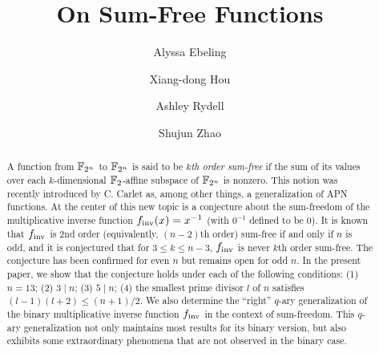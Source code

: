 \documentclass{amsart}
\numberwithin{equation}{section}
\theoremstyle{definition}
\begin{document}
\title[On Sum-Free Functions]{On Sum-Free Functions}

\author[A. Ebeling]{Alyssa Ebeling}
\address{School of Mathematical and Physical Sciences, Wisconsin Lutheran College, Milwaukee, WI 53226}

\author[X. Hou]{Xiang-dong Hou}
\address{Department of Mathematics and Statistics,
University of South Florida, Tampa, FL 33620}

\author[A. Rydell]{Ashley Rydell}
\address{Mathematics and Statistics Department,
Sonoma State University,
Rohnert Park, CA 94928}

\author[S. Zhao]{Shujun Zhao}
\address{Department of Mathematics and Statistics,
University of South Florida, Tampa, FL 33620}



\begin{abstract}
A function from $\Bbb F_{2^n}$ to $\Bbb F_{2^n}$ is said to be {\em $k$th order sum-free} if the sum of its values over each $k$-dimensional $\Bbb F_2$-affine subspace of $\Bbb F_{2^n}$ is nonzero. This notion was recently introduced by C. Carlet as, among other things, a generalization of APN functions. At the center of this new topic is a conjecture about the sum-freedom of the multiplicative inverse function $f_{\text{\rm inv}}(x)=x^{-1}$ (with $0^{-1}$ defined to be $0$). It is known that $f_{\text{\rm inv}}$ is 2nd order (equivalently, $(n-2)$th order) sum-free if and only if $n$ is odd, and it is conjectured that for $3\le k\le n-3$, $f_{\text{\rm inv}}$ is never $k$th order sum-free. The conjecture has been confirmed for even $n$ but remains open for odd $n$. In the present paper, we show that the conjecture holds under each of the following conditions: (1) $n=13$; (2) $3\mid n$; (3) $5\mid n$; (4) the smallest prime divisor $l$ of $n$ satisfies $(l-1)(l+2)\le (n+1)/2$. We also determine the ``right'' $q$-ary generalization of the binary multiplicative inverse function $f_{\text{\rm inv}}$ in the context of sum-freedom. This $q$-ary generalization not only maintains most results for its binary version, but also exhibits some extraordinary phenomena that are not observed in the binary case.
\end{abstract}
\end{document}
